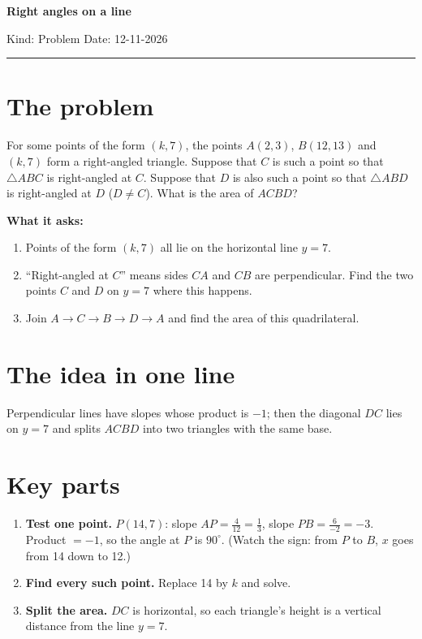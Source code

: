 \documentclass[11pt,a4paper]{article}
\begin{document}
{\LARGE\bfseries\color{accent} Right angles on a line}\par
\vspace{2pt}
{\small Kind: Problem \quad Date: 12-11-2026}
\vspace{6pt}\hrule\vspace{6pt}

\section{The problem}
For some points of the form $(k,7)$, the points $A(2,3)$, $B(12,13)$ and $(k,7)$ form a
right-angled triangle. Suppose that $C$ is such a point so that $\triangle ABC$ is
right-angled at $C$. Suppose that $D$ is also such a point so that $\triangle ABD$ is
right-angled at $D$ ($D \ne C$). What is the area of $ACBD$?

\textbf{What it asks:}
\begin{enumerate}
  \item Points of the form $(k,7)$ all lie on the horizontal line $y = 7$.
  \item ``Right-angled at $C$'' means sides $CA$ and $CB$ are perpendicular.
        Find the two points $C$ and $D$ on $y=7$ where this happens.
  \item Join $A \to C \to B \to D \to A$ and find the area of this quadrilateral.
\end{enumerate}

\section{The idea in one line}
Perpendicular lines have slopes whose product is $-1$; then the diagonal $DC$ lies on $y=7$
and splits $ACBD$ into two triangles with the same base.

\section{Key parts}
\begin{enumerate}
  \item \textbf{Test one point.} $P(14,7)$: slope $AP = \tfrac{4}{12} = \tfrac13$,
        slope $PB = \tfrac{6}{-2} = -3$. Product $= -1$, so the angle at $P$ is $90^\circ$.
        (Watch the sign: from $P$ to $B$, $x$ goes from 14 down to 12.)
  \item \textbf{Find every such point.} Replace 14 by $k$ and solve.
  \item \textbf{Split the area.} $DC$ is horizontal, so each triangle's height is a
        vertical distance from the line $y = 7$.
\end{enumerate}
\end{document}
